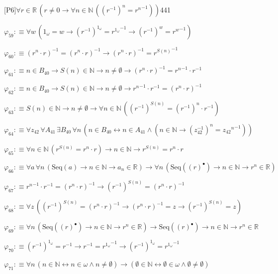 \begin{fullproof}{[P6]}{$\forall r \in \mathbb{R}\,(r \neq 0 \to \forall n \in \mathbb{N}\,({{(r^{-1})}^{n}} = {{r}^{n}}^{-1}))$}{441}
\begin{abbrevlist}
\item $\varphi_{59} :\equiv \forall w\,(1_{\omega} = w \to {{(r^{-1})}^{1_{\omega}}} = {{r}^{1_{\omega}}}^{-1} \to {{(r^{-1})}^{w}} = {{r}^{w}}^{-1})$
\item $\varphi_{60} :\equiv ({{r}^{n}} \cdot r)^{-1} = ({{r}^{n}} \cdot r)^{-1} \to ({{r}^{n}} \cdot r)^{-1} = {{r}^{S(n)}}^{-1}$
\item $\varphi_{61} :\equiv n \in B_{40} \to S(n) \in \mathbb{N} \to n \neq \emptyset \to ({{r}^{n}} \cdot r)^{-1} = {{r}^{n}}^{-1} \cdot r^{-1}$
\item $\varphi_{62} :\equiv n \in B_{40} \to S(n) \in \mathbb{N} \to n \neq \emptyset \to {{r}^{n}}^{-1} \cdot r^{-1} = ({{r}^{n}} \cdot r)^{-1}$
\item $\varphi_{63} :\equiv S(n) \in \mathbb{N} \to n \neq \emptyset \to \forall n \in \mathbb{N}\,({{(r^{-1})}^{S(n)}} = {{(r^{-1})}^{n}} \cdot r^{-1})$
\item $\varphi_{64} :\equiv \forall z_{42}\,\forall A_{41}\,\exists B_{40}\,\forall n\,(n \in B_{40} \leftrightarrow n \in A_{41} \land (n \in \mathbb{N} \to {{(z_{42}^{-1})}^{n}} = {{z_{42}}^{n}}^{-1}))$
\item $\varphi_{65} :\equiv \forall n \in \mathbb{N}\,({{r}^{S(n)}} = {{r}^{n}} \cdot r) \to n \in \mathbb{N} \to {{r}^{S(n)}} = {{r}^{n}} \cdot r$
\item $\varphi_{66} :\equiv \forall a\,\forall n\,(\mathrm{Seq}(a) \to n \in \mathbb{N} \to a_{n} \in \mathbb{R}) \to \forall n\,(\mathrm{Seq}({(r)^{\bullet}}) \to n \in \mathbb{N} \to {{r}^{n}} \in \mathbb{R})$
\item $\varphi_{67} :\equiv {{r}^{n}}^{-1} \cdot r^{-1} = ({{r}^{n}} \cdot r)^{-1} \to {{(r^{-1})}^{S(n)}} = ({{r}^{n}} \cdot r)^{-1}$
\item $\varphi_{68} :\equiv \forall z\,({{(r^{-1})}^{S(n)}} = ({{r}^{n}} \cdot r)^{-1} \to ({{r}^{n}} \cdot r)^{-1} = z \to {{(r^{-1})}^{S(n)}} = z)$
\item $\varphi_{69} :\equiv \forall n\,(\mathrm{Seq}({(r)^{\bullet}}) \to n \in \mathbb{N} \to {{r}^{n}} \in \mathbb{R}) \to \mathrm{Seq}({(r)^{\bullet}}) \to n \in \mathbb{N} \to {{r}^{n}} \in \mathbb{R}$
\item $\varphi_{70} :\equiv {{(r^{-1})}^{1_{\omega}}} = r^{-1} \to r^{-1} = {{r}^{1_{\omega}}}^{-1} \to {{(r^{-1})}^{1_{\omega}}} = {{r}^{1_{\omega}}}^{-1}$
\item $\varphi_{71} :\equiv \forall n\,(n \in \mathbb{N} \leftrightarrow n \in \omega \land n \neq \emptyset) \to (\emptyset \in \mathbb{N} \leftrightarrow \emptyset \in \omega \land \emptyset \neq \emptyset)$

\end{abbrevlist}
\end{fullproof}
